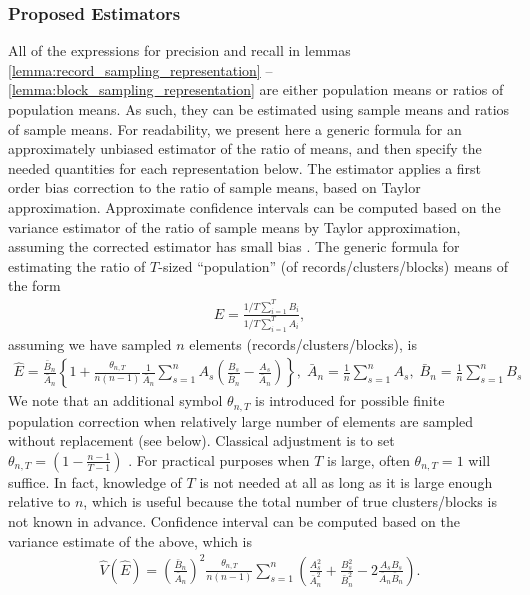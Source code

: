 \documentclass[fontsize=11pt]{article}
\theoremstyle{definition}
\begin{document}
\subsubsection{Proposed Estimators}

All of the expressions for precision and recall in lemmas \ref{lemma:record_sampling_representation} -- \ref{lemma:block_sampling_representation} are either population means or ratios of population means. As such, they can be estimated using sample means and ratios of sample means. For readability, we present here a generic formula for an approximately unbiased estimator of the ratio of means, and then specify the needed quantities for each representation below. The estimator applies a first order bias correction to the ratio of sample means, based on Taylor approximation. Approximate confidence intervals can be computed based on the variance estimator of the ratio of sample means by Taylor approximation, assuming the corrected estimator has small bias \citep{fuller2011sampling}. The generic formula for estimating the ratio of $T$-sized ``population'' (of records/clusters/blocks) means of the form
\begin{align}
    E=\frac{1/T\sum_{i=1}^{T} B_i}{1/T\sum_{i=1}^T A_i},
\end{align}
assuming we have sampled $n$ elements (records/clusters/blocks), is
\begin{align}\label{eq:bias_adjustment}
    \widehat{E}=\frac{\bar{B}_n}{\bar{A}_n}\left\{1 + \frac{\theta_{n,T}}{n(n-1)}\frac{1}{\bar{A}_n}\sum_{s=1}^n A_s
    \left(\frac{B_s}{\bar{B}_n} - \frac{A_s}{\bar{A}_n}\right)\right\},\;
    \bar{A}_n = \frac{1}{n}\sum_{s=1}^{n}A_s,\;
    \bar{B}_n = \frac{1}{n}\sum_{s=1}^{n}B_s
\end{align}
We note that an additional symbol $\theta_{n,T}$ is introduced for possible finite population correction when relatively large number of elements are sampled without replacement (see below). Classical adjustment is to set $\theta_{n,T} = (1 - \frac{n-1}{T-1})$ \citep{Cochran1977}. For practical purposes when $T$ is large, often $\theta_{n,T}=1$ will suffice. In fact, knowledge of $T$ is not needed at all as long as it is large enough relative to $n$, which is useful because the total number of true clusters/blocks is not known in advance. Confidence interval can be computed based on the variance estimate of the above, which is
\begin{align} \label{eq:estimated_variance}
    \widehat{V}(\widehat{E})=\left( \frac{\bar{B}_n}{\bar{A}_n} \right)^2\frac{\theta_{n,T}}{n(n-1)}
    \sum_{s=1}^n \left( \frac{A_s^2}{\bar{A}_n^2} + \frac{B_s^2}{\bar{B}_n^2} - 2\frac{A_sB_s}{\bar{A}_n\bar{B}_n} \right).
\end{align}
\end{document}
